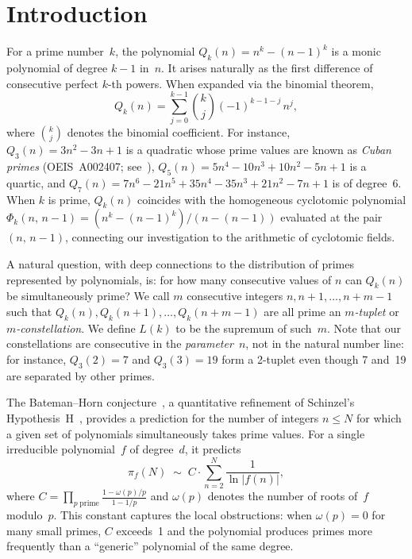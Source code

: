 \documentclass[11pt,a4paper]{article}
\newcommand{\Qk}{Q_k}
\begin{document}
\section{Introduction}

For a prime number~$k$, the polynomial $\Qk(n) = n^k - (n-1)^k$ is a monic polynomial of degree $k-1$ in~$n$. It arises naturally as the first difference of consecutive perfect $k$-th powers. When expanded via the binomial theorem,
\[
  \Qk(n) = \sum_{j=0}^{k-1} \binom{k}{j} (-1)^{k-1-j}\, n^j,
\]
where $\binom{k}{j}$ denotes the binomial coefficient. For instance, $Q_3(n) = 3n^2 - 3n + 1$ is a quadratic whose prime values are known as \emph{Cuban primes} (OEIS~A002407; see~\cite{ribenboim, cunningham}), $Q_5(n) = 5n^4 - 10n^3 + 10n^2 - 5n + 1$ is a quartic, and $Q_7(n) = 7n^6 - 21n^5 + 35n^4 - 35n^3 + 21n^2 - 7n + 1$ is of degree~6. When $k$ is prime, $\Qk(n)$ coincides with the homogeneous cyclotomic polynomial $\Phi_k(n,\, n-1) = (n^k - (n-1)^k)/(n - (n-1))$ evaluated at the pair $(n,\, n-1)$, connecting our investigation to the arithmetic of cyclotomic fields.

A natural question, with deep connections to the distribution of primes represented by polynomials, is: for how many consecutive values of $n$ can $\Qk(n)$ be simultaneously prime? We call $m$ consecutive integers $n, n+1, \ldots, n+m-1$ such that $\Qk(n), \Qk(n+1), \ldots, \Qk(n+m-1)$ are all prime an \emph{$m$-tuplet} or \emph{$m$-constellation}. We define $L(k)$ to be the supremum of such~$m$. Note that our constellations are consecutive in the \emph{parameter}~$n$, not in the natural number line: for instance, $Q_3(2) = 7$ and $Q_3(3) = 19$ form a 2-tuplet even though 7 and~19 are separated by other primes.

The Bateman--Horn conjecture~\cite{batemanhorn}, a quantitative refinement of Schinzel's Hypothesis~H~\cite{schinzel}, provides a prediction for the number of integers $n \le N$ for which a given set of polynomials simultaneously takes prime values. For a single irreducible polynomial~$f$ of degree~$d$, it predicts
\[
  \pi_f(N) \;\sim\; C \cdot \sum_{n=2}^{N} \frac{1}{\ln|f(n)|},
\]
where $C = \prod_{p\;\mathrm{prime}} \frac{1 - \omega(p)/p}{1 - 1/p}$ and $\omega(p)$ denotes the number of roots of~$f$ modulo~$p$. This constant captures the local obstructions: when $\omega(p) = 0$ for many small primes, $C$ exceeds~1 and the polynomial produces primes more frequently than a ``generic'' polynomial of the same degree.
\end{document}
